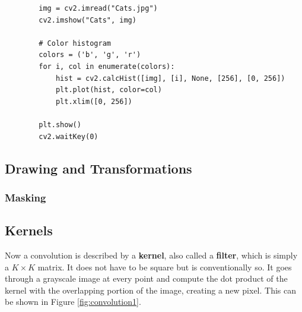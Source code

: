 \documentclass{article}
\begin{document}
      \begin{lstlisting}
        img = cv2.imread("Cats.jpg")
        cv2.imshow("Cats", img) 

        # Color histogram 
        colors = ('b', 'g', 'r') 
        for i, col in enumerate(colors): 
            hist = cv2.calcHist([img], [i], None, [256], [0, 256]) 
            plt.plot(hist, color=col) 
            plt.xlim([0, 256]) 
            
        plt.show() 
        cv2.waitKey(0) 
      \end{lstlisting}

  \subsection{Drawing and Transformations}

    \subsubsection{Masking}

  \subsection{Kernels}

    Now a convolution is described by a \textbf{kernel}, also called a \textbf{filter}, which is simply a $K \times K$ matrix. It does not have to be square but is conventionally so. It goes through a grayscale image at every point and compute the dot product of the kernel with the overlapping portion of the image, creating a new pixel. This can be shown in Figure \ref{fig:convolution1}. 
\end{document}
